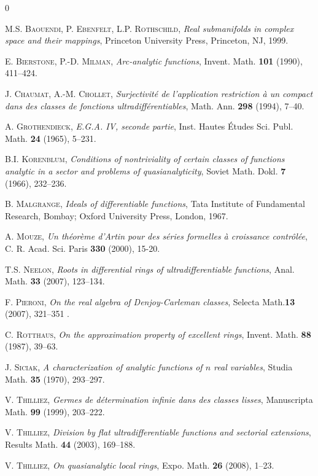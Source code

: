 \documentclass[a4paper]{amsart}
\theoremstyle{plain}
\theoremstyle{remark}
\begin{document}
\begin{thebibliography}{0}

 \textsc{M.S. Baouendi, P. Ebenfelt, L.P. Rothschild}, \textit{
Real submanifolds in complex space and their mappings}, Princeton University Press, Princeton, NJ, 1999.  

 \textsc{E. Bierstone, P.-D. Milman}, \textit{Arc-analytic functions}, Invent. Math. \textbf{101} (1990), 411--424.


 \textsc{J. Chaumat, A.-M. Chollet}, \textit{Surjectivit\'e de l'application restriction \`a un compact dans des classes de fonctions ultradiff\'erentiables}, Math. Ann. \textbf{298} (1994), 7--40.

 \textsc{A. Grothendieck}, \textit{E.G.A. IV, seconde partie}, Inst. Hautes \'Etudes Sci. Publ. Math.  \textbf{24} (1965), 5--231.

 \textsc{B.I. Korenblum}, \textit{Conditions of nontriviality of certain classes of functions analytic in a sector and problems of quasianalyticity}, Soviet Math. Dokl. \textbf{7} (1966), 232--236.

 \textsc{B. Malgrange}, \textit{Ideals of differentiable functions}, Tata Institute of Fundamental Research, Bombay; Oxford University Press, London, 1967.

 \textsc{A. Mouze}, \textit{Un th\'eor\`eme d'Artin pour des s\'eries formelles \`a croissance contr\^ol\'ee}, C. R. Acad. Sci. Paris \textbf{330} (2000), 15-20.

 \textsc{T.S. Neelon}, \textit{Roots in differential rings of ultradifferentiable functions}, Anal. Math. \textbf{33} (2007), 123--134.

 \textsc{F. Pieroni}, \textit{On the real algebra of Denjoy-Carleman classes}, Selecta Math.\textbf{13} (2007), 321--351 .

 \textsc{C. Rotthaus}, \textit{On the approximation property of excellent rings}, Invent. Math. \textbf{88} (1987), 39--63.

 \textsc{J. Siciak}, \textit{A characterization of analytic functions of $ n $ real variables}, Studia Math. \textbf{35} (1970), 293--297.

  \textsc{V. Thilliez}, \textit{Germes de d\'etermination infinie dans des classes lisses}, Manuscripta Math. \textbf{99} (1999), 203--222.

 \textsc{V. Thilliez}, \textit{Division by flat ultradifferentiable functions and sectorial extensions}, Results Math. \textbf{44} (2003), 169--188.

 \textsc{V. Thilliez}, \textit{On quasianalytic local rings}, Expo. Math. \textbf{26} (2008), 1--23.

\end{thebibliography}
\end{document}
